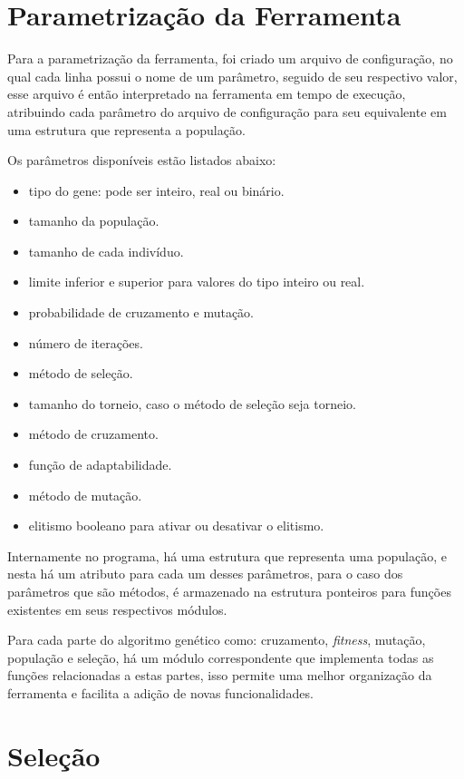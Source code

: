 \documentclass[12pt]{article}
\begin{document}
\section{Parametrização da Ferramenta}

Para a parametrização da ferramenta, foi criado um arquivo de configuração, no qual cada linha possui o nome de um parâmetro, seguido de 
seu respectivo valor, esse arquivo é então interpretado na ferramenta em tempo de execução, atribuindo cada parâmetro do arquivo de 
configuração para seu equivalente em uma estrutura que representa a população.

Os parâmetros disponíveis estão listados abaixo: 
\begin{itemize}
    \item tipo do gene: pode ser inteiro, real ou binário.
    \item tamanho da população.
    \item tamanho de cada indivíduo.
    \item limite inferior e superior para valores do tipo inteiro ou real.
    \item probabilidade de cruzamento e mutação.
    \item número de iterações.
    \item método de seleção.
    \item tamanho do torneio, caso o método de seleção seja torneio.
    \item método de cruzamento.
    \item função de adaptabilidade.
    \item método de mutação.
    \item elitismo booleano para ativar ou desativar o elitismo.
\end{itemize}

Internamente no programa, há uma estrutura que representa uma população, e nesta há um atributo para cada um desses parâmetros, para o caso 
dos parâmetros que são métodos, é armazenado na estrutura ponteiros para funções existentes em seus respectivos módulos.

Para cada parte do algoritmo genético como: cruzamento, \textit{fitness}, mutação, população e seleção, há um módulo correspondente que 
implementa todas as funções relacionadas a estas partes, isso permite uma melhor organização da ferramenta e facilita a adição de novas funcionalidades.

\section{Seleção}
\end{document}
